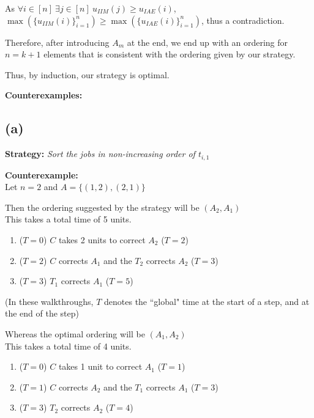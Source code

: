 \documentclass[11pt, fleqn]{article}
\begin{document}
\medskip
As $\forall i\in[n] \ \exists j \in [n] \ u_{IIM}(j) \ge u_{IAE}(i)$, $\max{(\{u_{IIM}(i)\}_{i=1}^n)} \ge \max{(\{u_{IAE}(i)\}_{i=1}^n)}$, thus a contradiction.

\medskip
Therefore, after introducing $A_m$ at the end, we end up with an ordering for $n=k+1$ elements that is consistent with the ordering given by our strategy.

\smallskip
Thus, by induction, our strategy is optimal.

\hrulefill
\medskip

\begin{center}
    \textbf{\large{Counterexamples:}}
\end{center}

\subsection*{(a)}
\textbf{Strategy:} \textit{Sort the jobs in non-increasing order of $t_{i,1}$}

\smallskip
\textbf{Counterexample:}\\
Let $n=2$ and $A = \{(1,2), (2,1)\}$

\smallskip
Then the ordering suggested by the strategy will be $(A_2,A_1)$\\
This takes a total time of 5 units.
\begin{enumerate}[itemsep=-0.5ex,topsep=1pt]
    \item ($T = 0$) $C$ takes 2 units to correct $A_2$ ($T = 2$)
    \item ($T = 2$) $C$ corrects $A_1$ and the $T_2$ corrects $A_2$ ($T = 3$)
    \item ($T = 3$) $T_1$ corrects $A_1$ ($T = 5$)
\end{enumerate}
(In these walkthroughs, $T$ denotes the ``global" time at the start of a step, and at the end of the step)

\smallskip
Whereas the optimal ordering will be $(A_1, A_2)$\\
This takes a total time of 4 units.
\begin{enumerate}[itemsep=-0.5ex,topsep=1pt]
    \item ($T = 0$) $C$ takes 1 unit to correct $A_1$ ($T = 1$)
    \item ($T = 1$) $C$ corrects $A_2$ and the $T_1$ corrects $A_1$ ($T = 3$)
    \item ($T = 3$) $T_2$ corrects $A_2$ ($T = 4$)
\end{enumerate}
\end{document}

